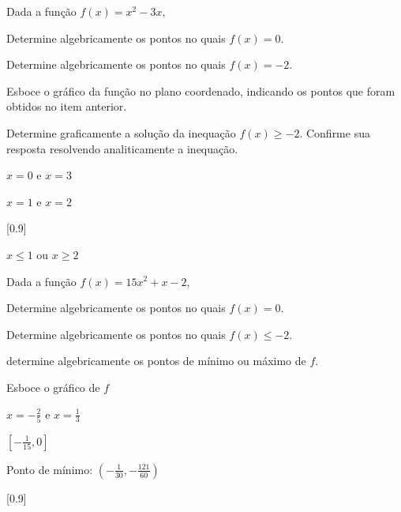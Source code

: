 \begin{exercises*}
\begin{exercise}
  Dada a função $f(x)= x^2-3x$,
  \begin{alphalist}
    \item Determine algebricamente os pontos no quais $f(x)=0$.
    \item Determine algebricamente os pontos no quais $f(x)=-2$.
    \item Esboce o gráfico da função no plano coordenado, indicando os
          pontos que foram obtidos no item anterior.
    \item Determine graficamente a solução da inequação $f(x) \geq -2$.
          Confirme sua resposta resolvendo analiticamente a inequação.
  \end{alphalist}

  \begin{answer}
    \begin{alphalist}
      \item $x=0$ e $x=3$
      \item $x=1$ e $x=2$
      \item {}[0.9]
      \item $x \leq 1$ ou $x \geq 2$
    \end{alphalist}
  \end{answer}
\end{exercise}

\begin{exercise}
  Dada a função $f(x)= 15x^2+x-2$,
  \begin{alphalist}
    \item Determine algebricamente os pontos no quais $f(x)=0$.
    \item Determine algebricamente os pontos no quais $f(x) \leq-2$.
    \item determine algebricamente os pontos de mínimo ou máximo de $f$.
    \item Esboce o gráfico de $f$
  \end{alphalist}

  \begin{answer}
    \begin{alphalist}
      \item \( x=-\frac{2}{5} \) e \( x=\frac{1}{3} \)
      \item \( \left[-\frac{1}{15}, 0\right] \)
      \item Ponto de mínimo: \( \left(-\frac{1}{30}, -\frac{121}{60}\right) \)
      \item {}[0.9]
    \end{alphalist}
  \end{answer}
\end{exercise}


\end{exercises*}
